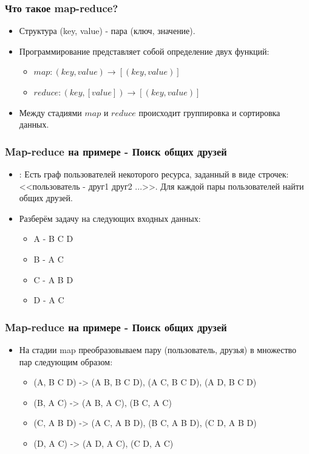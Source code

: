\documentclass{beamer}
\begin{document}
    \begin{frame}
    \frametitle{Что такое map-reduce?}
        \begin{itemize}
            \item Структура (key, value) - пара (ключ, значение).
            \item Программирование представляет собой определение двух функций:
            \begin{itemize}
                \item $map: (key, value)\rightarrow[(key, value)]$
                \item $reduce: (key, [value])\rightarrow[(key, value)]$
            \end{itemize}
            \item Между стадиями $map$ и $reduce$ происходит группировка и сортировка данных.
            
        \end{itemize} 
    \end{frame}

    \begin{frame}
    \frametitle{Map-reduce на примере - Поиск общих друзей}
        \begin{itemize}
            \item {:} Есть граф пользователей некоторого ресурса, заданный в виде строчек: <<пользователь - друг1 друг2 ...>>. Для каждой пары пользователей найти общих друзей.
            \item Разберём задачу на следующих входных данных: \\
                \begin{itemize}
                    \item A - B C D
                    \item B - A C
                    \item C - A B D
                    \item D - A C
                \end{itemize}          
        \end{itemize} 
    \end{frame}  


    \begin{frame}
    \frametitle{Map-reduce на примере - Поиск общих друзей}
        \begin{itemize}
            \item На стадии map преобразовываем пару (пользователь, друзья) в множество пар следующим образом:
            \begin{itemize}
                \item (A, B C D) -> (A B, B C D), (A C, B C D), (A D, B C D)
                \item (B, A C) -> (A B, A C), (B C, A C)
                \item (C, A B D) -> (A C, A B D), (B C, A B D), (C D, A B D)
                \item (D, A C) -> (A D, A C), (C D, A C)
            \end{itemize}
        \end{itemize}
    \end{frame} 
\end{document}
